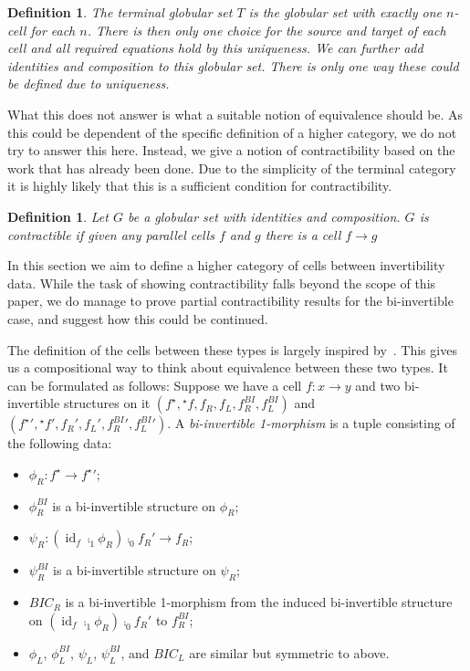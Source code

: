 \documentclass[draft]{article}
\newtheorem{definition}[theorem]{Definition} \theoremstyle{remark}
\DeclareMathOperator{\id}{id}
\newcommand{\linv}[1]{{}^\star\!#1} \newcommand{\rinv}[1]{#1^\star}
\begin{document}
\begin{definition}
  The \emph{terminal globular set} \(T\) is the globular set with exactly one
  \(n\)-cell for each \(n\). There is then only one choice for the
  source and target of each cell and all required equations hold by
  this uniqueness. We can further add identities and composition to
  this globular set. There is only one way these could be defined due
  to uniqueness.
\end{definition}

What this does not answer is what a suitable notion of equivalence
should be. As this could be dependent of the specific definition of a
higher category, we do not try to answer this here. Instead, we give a
notion of contractibility based on the work that has already been
done. Due to the simplicity of the terminal category it is highly
likely that this is a sufficient condition for contractibility.

\begin{definition}
  Let \(G\) be a globular set with identities and composition. \(G\)
  is \emph{contractible} if given any parallel cells \(f\) and \(g\)
  there is a cell \(f \to g\)
\end{definition}

In this section we aim to define a higher category of cells between
invertibility data. While the task of showing contractibility falls
beyond the scope of this paper, we do manage to prove partial
contractibility results for the bi-invertible case, and suggest how
this could be continued.

The definition of the cells between these types is largely inspired
by~\cite[Lemma 4.2.5]{hottbook}. This gives us a compositional way to
think about equivalence between these two types. It can be formulated
as follows: Suppose we have a cell \(f : x \to y\) and two
bi-invertible structures on it \((\rinv f, \linv f, f_R, f_L,
f_R^{BI}, f_L^{BI})\) and \((\rinv f{}' , \linv f{}', f_R', f_L',
f_R^{BI}{}', f_L^{BI}{}')\). A \emph{bi-invertible 1-morphism} is a tuple
consisting of the following data:
\begin{itemize}
\item \(\phi_R : \rinv f \to \rinv f{}'\);
\item \(\phi_R^{BI}\) is a bi-invertible structure on \(\phi_R\);
\item \(\psi_R : (\id_f \comp_1 \phi_R) \comp_0 f_R' \to f_R\);
\item \(\psi_R^{BI}\) is a bi-invertible structure on \(\psi_R\);
\item \(BIC_R\) is a bi-invertible 1-morphism from the induced bi-invertible structure on
  \((\id_f \comp_1 \phi_R) \comp_0 f_R'\) to \(f_R^{BI}\);
\item \(\phi_L\), \(\phi_L^{BI}\), \(\psi_L\), \(\psi_L^{BI}\), and
  \(BIC_L\) are similar but symmetric to above.
\end{itemize}
\end{document}
